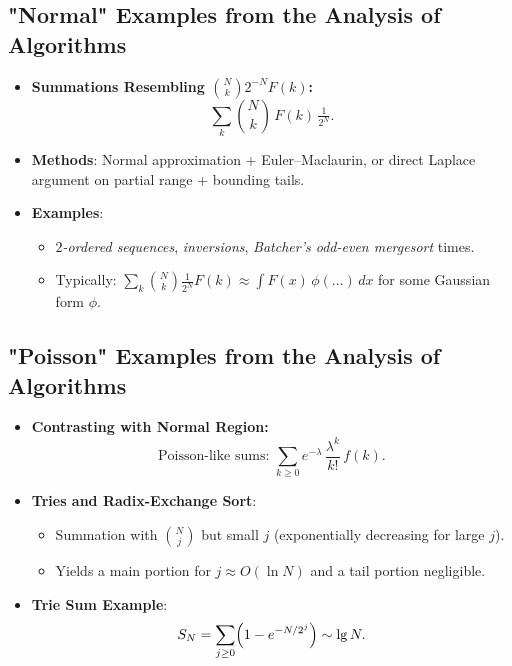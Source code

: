 \documentclass[11pt,letterpaper]{article}
\begin{document}
\subsection{"Normal" Examples from the Analysis of Algorithms}
\begin{itemize}
  \item \textbf{Summations Resembling $\binom{N}{k}2^{-N}F(k)$:} 
    \[
      \sum_{k} \binom{N}{k}\,F(k)\,\tfrac{1}{2^N}.
    \]
  \item \textbf{Methods}: Normal approximation + Euler--Maclaurin, or direct Laplace argument on partial range + bounding tails.
  \item \textbf{Examples}:
    \begin{itemize}
      \item \emph{$2$-ordered sequences}, \emph{inversions}, \emph{Batcher’s odd-even mergesort} times.
      \item Typically: $\sum_k \binom{N}{k}\frac{1}{2^N} F(k)\approx \int F(x)\,\phi(\dots)\,dx$ for some Gaussian form $\phi$.
    \end{itemize}
\end{itemize}

\subsection{"Poisson" Examples from the Analysis of Algorithms}
\begin{itemize}
  \item \textbf{Contrasting with Normal Region:} 
    \[
      \text{Poisson-like sums: } \sum_{k\ge0} e^{-\lambda}\,\frac{\lambda^k}{k!}\,f(k).
    \]
  \item \textbf{Tries and Radix-Exchange Sort}:
    \begin{itemize}
      \item Summation with $\displaystyle \binom{N}{j}$ but small $j$ (exponentially decreasing for large $j$).
      \item Yields a main portion for $j \approx O(\ln N)$ and a tail portion negligible.
    \end{itemize}
  \item \textbf{Trie Sum Example}:
    \[
      S_N = \sum_{j\ge0}\Bigl(1-e^{-N/2^j}\Bigr)\sim \lg N.
    \]
\end{itemize}

\end{document}
